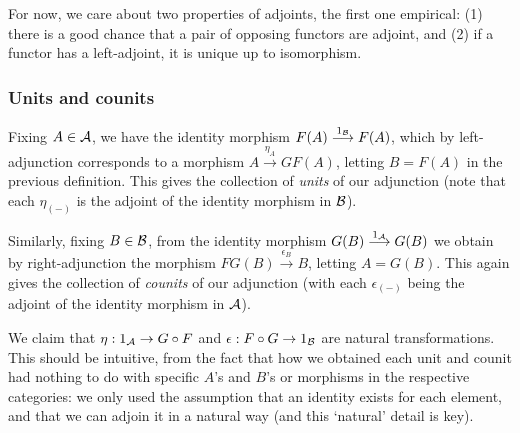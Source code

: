 For now, we care about two properties of adjoints, the first one empirical: (1) there is a good chance that a pair of opposing functors are adjoint, and (2) if a functor has a left-adjoint, it is unique up to isomorphism.


\subsubsection{Units and counits}
Fixing $A\in\mathcal{A}$, we have the identity morphism $F(A) \overset{1_{\mathcal{B}}}{\longrightarrow} F(A)$, which by left-adjunction corresponds to a morphism $A \overset{\eta_A}{\longrightarrow} GF(A)$, letting $B=F(A)$ in the previous definition. This gives the collection of \emph{units} of our adjunction (note that each $\eta_{(-)}$ is the adjoint of the identity morphism in $\mathcal{B}$).

Similarly, fixing $B\in\mathcal{B}$, from the identity morphism $G(B) \overset{1_{\mathcal{A}}}{\longrightarrow} G(B)$ we obtain by right-adjunction the morphism $FG(B) \overset{\epsilon_B}{\longrightarrow} B$, letting $A=G(B)$. This again gives the collection of \emph{counits} of our adjunction (with each $\epsilon_{(-)}$ being the adjoint of the identity morphism in $\mathcal{A}$).

We claim that $\eta : 1_{\mathcal{A}} \to G\circ F$ and $\epsilon : F\circ G \to 1_{\mathcal{B}}$ are natural transformations. This should be intuitive, from the fact that how we obtained each unit and counit had nothing to do with specific $A$'s and $B$'s or morphisms in the respective categories: we only used the assumption that an identity exists for each element, and that we can adjoin it in a natural way (and this `natural' detail is key).

